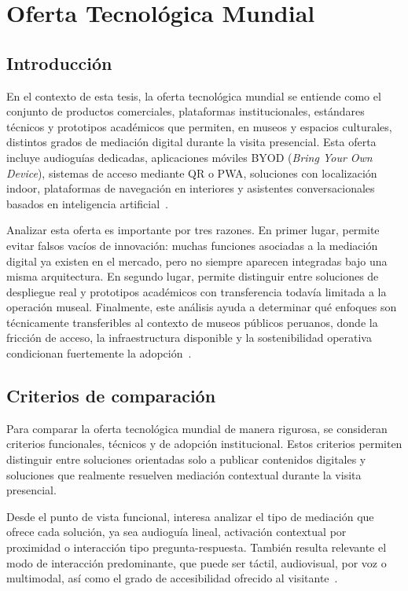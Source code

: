 \chapter{Oferta Tecnológica Mundial}

\section{Introducción}

En el contexto de esta tesis, la oferta tecnológica mundial se entiende como el conjunto de productos comerciales, plataformas institucionales, estándares técnicos y prototipos académicos que permiten, en museos y espacios culturales, distintos grados de mediación digital durante la visita presencial. Esta oferta incluye audioguías dedicadas, aplicaciones móviles BYOD (\textit{Bring Your Own Device}), sistemas de acceso mediante QR o PWA, soluciones con localización indoor, plataformas de navegación en interiores y asistentes conversacionales basados en inteligencia artificial~\cite{bloomberg2025connects,smartifyplatform,locatifypricing,verde2023blemuseum,ivanov2025smartmuseums}.

Analizar esta oferta es importante por tres razones. En primer lugar, permite evitar falsos vacíos de innovación: muchas funciones asociadas a la mediación digital ya existen en el mercado, pero no siempre aparecen integradas bajo una misma arquitectura. En segundo lugar, permite distinguir entre soluciones de despliegue real y prototipos académicos con transferencia todavía limitada a la operación museal. Finalmente, este análisis ayuda a determinar qué enfoques son técnicamente transferibles al contexto de museos públicos peruanos, donde la fricción de acceso, la infraestructura disponible y la sostenibilidad operativa condicionan fuertemente la adopción~\cite{unesco2025globalreport,museoscultura,osiptel2024smartphone,sala2025museumapps}.

\section{Criterios de comparación}

Para comparar la oferta tecnológica mundial de manera rigurosa, se consideran criterios funcionales, técnicos y de adopción institucional. Estos criterios permiten distinguir entre soluciones orientadas solo a publicar contenidos digitales y soluciones que realmente resuelven mediación contextual durante la visita presencial.

Desde el punto de vista funcional, interesa analizar el tipo de mediación que ofrece cada solución, ya sea audioguía lineal, activación contextual por proximidad o interacción tipo pregunta-respuesta. También resulta relevante el modo de interacción predominante, que puede ser táctil, audiovisual, por voz o multimodal, así como el grado de accesibilidad ofrecido al visitante~\cite{wang2024voiceguide,hearonymusaccessibility}.

